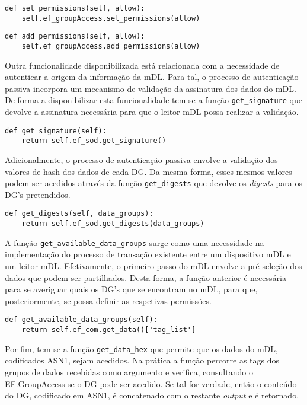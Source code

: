 \begin{Verbatim}[frame=single, framerule=0.5mm]
def set_permissions(self, allow):
	self.ef_groupAccess.set_permissions(allow)
\end{Verbatim}

\begin{Verbatim}[frame=single, framerule=0.5mm]
def add_permissions(self, allow):
	self.ef_groupAccess.add_permissions(allow)
\end{Verbatim}

Outra funcionalidade disponibilizada está relacionada com a necessidade de autenticar a origem da informação da mDL\@. Para tal, o processo de autenticação passiva incorpora um mecanismo de validação da assinatura dos dados do mDL\@. De forma a disponibilizar esta funcionalidade tem-se a função \texttt{get\_signature} que devolve a assinatura necessária para que o leitor mDL possa realizar a validação.

\begin{Verbatim}[frame=single, framerule=0.5mm]
def get_signature(self):
    return self.ef_sod.get_signature()
\end{Verbatim}

Adicionalmente, o processo de autenticação passiva envolve a validação dos valores de hash dos dados de cada DG\@. Da mesma forma, esses mesmos valores podem ser acedidos através da função \texttt{get\_digests} que devolve os \textit{digests} para os DG's pretendidos.

\begin{Verbatim}[frame=single, framerule=0.5mm]
def get_digests(self, data_groups):
	return self.ef_sod.get_digests(data_groups)
\end{Verbatim}

A função \texttt{get\_available\_data\_groups} surge como uma necessidade na implementação do processo de transação existente entre um dispositivo mDL e um leitor mDL\@. Efetivamente, o primeiro passo do mDL envolve a pré-seleção dos dados que podem ser partilhados. Desta forma, a função anterior é necessária para se averiguar quais os DG's que se encontram no mDL, para que, posteriormente, se possa definir as respetivas permissões.

\begin{Verbatim}[frame=single, framerule=0.5mm]
def get_available_data_groups(self):
	return self.ef_com.get_data()['tag_list']
\end{Verbatim}

Por fim, tem-se a função \texttt{get\_data\_hex} que permite que os dados do mDL, codificados ASN1, sejam acedidos. Na prática a função percorre as tags dos grupos de dados recebidas como argumento e verifica, consultando o EF.GroupAccess se o DG pode ser acedido. Se tal for verdade, então o conteúdo do DG, codificado em ASN1, é concatenado com o restante \textit{output} e é retornado.

